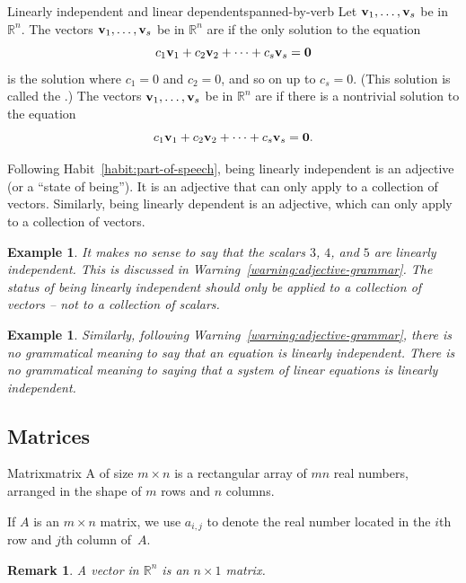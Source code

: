 \documentclass{book}
\newcounter{ekcounter}%
\theoremstyle{ekimcustom}
\newtheorem{example}[ekcounter]{Example}
\newtheorem{remark}[ekcounter]{Remark}
\newcommand\defn[1]{{\color{blue}{\bf #1}}}
\begin{document}
\begin{bdefinition}{Linearly independent and linear dependent}{spanned-by-verb}
Let ${\bf v}_1, \dots, {\bf v}_s$ be in $\mathbb{R}^n$. The vectors ${\bf v}_1, \dots, {\bf v}_s$ be in $\mathbb{R}^n$ are \defn{linearly independent} if the only solution to the equation
\[ c_1{\bf v}_1 + c_2{\bf v}_2 + \dots + c_s{\bf v}_s = {\bf 0} \]
is the solution where $c_1=0$ and $c_2=0$, and so on up to $c_s=0$. (This solution is called the \defn{trivial solution}.)
\vskip6pt
The vectors ${\bf v}_1, \dots, {\bf v}_s$ be in $\mathbb{R}^n$ are \defn{linearly dependent} if there is a nontrivial solution to the equation
\[ c_1{\bf v}_1 + c_2{\bf v}_2 + \dots + c_s{\bf v}_s = {\bf 0}. \]
\end{bdefinition}
Following Habit~\ref{habit:part-of-speech}, being linearly independent is an adjective (or a ``state of being''). It is an adjective that can only apply to a collection of vectors. Similarly, being linearly dependent is an adjective, which can only apply to a collection of vectors.
\begin{example}
It makes no sense to say that the scalars $3$, $4$, and $5$ are linearly independent. This is discussed in Warning~\ref{warning:adjective-grammar}. The status of being linearly independent should only be applied to a collection of vectors -- not to a collection of scalars.
\end{example}
\begin{example}
Similarly, following Warning~\ref{warning:adjective-grammar}, there is no grammatical meaning to say that an equation is linearly independent. There is no grammatical meaning to saying that a system of linear equations is linearly independent.
\end{example}

\subsection{Matrices}

\begin{bdefinition}{Matrix}{matrix}
A \defn{matrix} of size $m \times n$ is a rectangular array of $mn$ real numbers, arranged in the shape of $m$ rows and $n$ columns.
\end{bdefinition}
If $A$ is an $m \times n$ matrix, we use $a_{i,j}$ to denote the real number located in the $i$th row and $j$th column of~$A$.

\begin{remark}
A vector in $\mathbb{R}^n$ is an $n \times 1$ matrix.
\end{remark}
\end{document}
